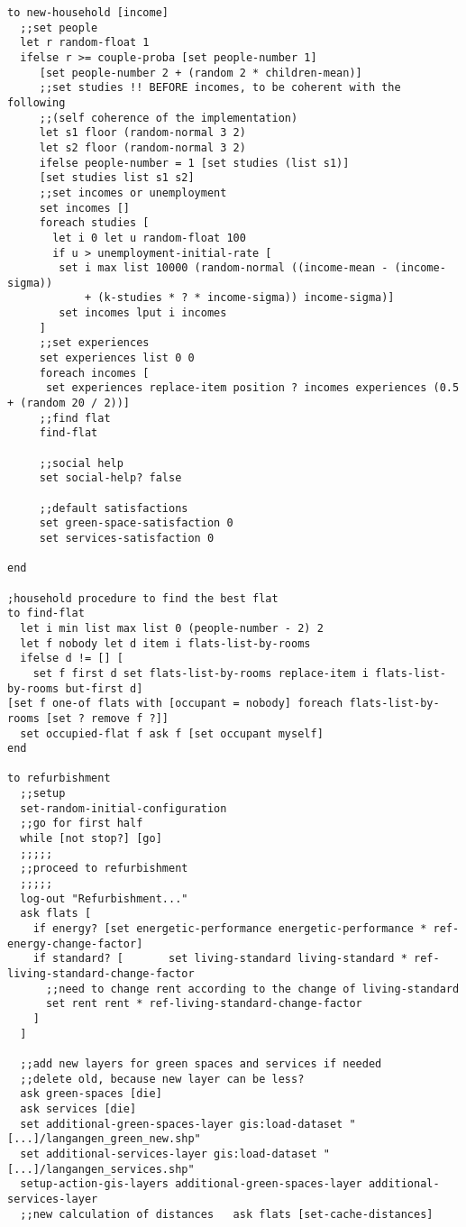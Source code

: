 \documentclass[english]{article}
\begin{document}
\begin{lstlisting}[basicstyle={\scriptsize}]
to new-household [income]
  ;;set people
  let r random-float 1
  ifelse r >= couple-proba [set people-number 1]
     [set people-number 2 + (random 2 * children-mean)]
     ;;set studies !! BEFORE incomes, to be coherent with the following
     ;;(self coherence of the implementation)
     let s1 floor (random-normal 3 2)
	 let s2 floor (random-normal 3 2)
     ifelse people-number = 1 [set studies (list s1)]
     [set studies list s1 s2]
     ;;set incomes or unemployment
     set incomes []
     foreach studies [
       let i 0 let u random-float 100
       if u > unemployment-initial-rate [
		set i max list 10000 (random-normal ((income-mean - (income-sigma))
			+ (k-studies * ? * income-sigma)) income-sigma)]
        set incomes lput i incomes
     ]
     ;;set experiences
     set experiences list 0 0
     foreach incomes [
      set experiences replace-item position ? incomes experiences (0.5 + (random 20 / 2))]
     ;;find flat
     find-flat

     ;;social help
     set social-help? false 

     ;;default satisfactions
     set green-space-satisfaction 0
     set services-satisfaction 0 

end

;household procedure to find the best flat
to find-flat
  let i min list max list 0 (people-number - 2) 2
  let f nobody let d item i flats-list-by-rooms
  ifelse d != [] [
	set f first d set flats-list-by-rooms replace-item i flats-list-by-rooms but-first d]
[set f one-of flats with [occupant = nobody] foreach flats-list-by-rooms [set ? remove f ?]]
  set occupied-flat f ask f [set occupant myself]
end

to refurbishment
  ;;setup
  set-random-initial-configuration
  ;;go for first half
  while [not stop?] [go]
  ;;;;;
  ;;proceed to refurbishment
  ;;;;;
  log-out "Refurbishment..."
  ask flats [
    if energy? [set energetic-performance energetic-performance * ref-energy-change-factor]
    if standard? [       set living-standard living-standard * ref-living-standard-change-factor
      ;;need to change rent according to the change of living-standard
      set rent rent * ref-living-standard-change-factor
    ]
  ] 
  
  ;;add new layers for green spaces and services if needed
  ;;delete old, because new layer can be less?
  ask green-spaces [die]
  ask services [die]
  set additional-green-spaces-layer gis:load-dataset "[...]/langangen_green_new.shp"
  set additional-services-layer gis:load-dataset "[...]/langangen_services.shp"
  setup-action-gis-layers additional-green-spaces-layer additional-services-layer
  ;;new calculation of distances   ask flats [set-cache-distances]
  

\end{lstlisting}
\end{document}
